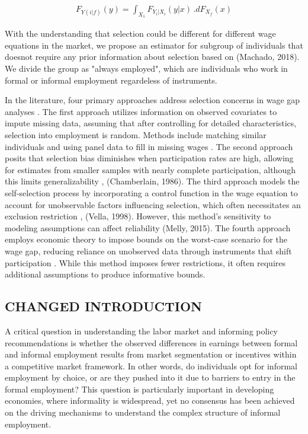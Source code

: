 \begin{linenomath*}
	\begin{align}
		F_{Y(i|f)} (y)= \int_{X_1} F_{Y_i|X_i}(y|x) \, . dF_{X_f}(x) 
	\end{align}
\end{linenomath*} 

With the understanding that selection could be different for different wage equations in the market, we propose an estimator for subgroup of individuals that doesnot require any prior information about selection based on (Machado, 2018). We divide the group as "always employed", which are individuals who work in formal or informal employment regardeless of instruments.

In the literature, four primary approaches address selection concerns in wage gap analyses \parencite{Machado2017}. The first approach utilizes information on observed covariates to impute missing data, assuming that after controlling for detailed characteristics, selection into employment is random. Methods include matching similar individuals and using panel data to fill in missing wages \parencite{Blau2006, Neal2004, Olivetti2016}. The second approach posits that selection bias diminishes when participation rates are high, allowing for estimates from smaller samples with nearly complete participation, although this limits generalizability \parencite{Mulligan2008} , (Chamberlain, 1986). The third approach models the self-selection process by incorporating a control function in the wage equation to account for unobservable factors influencing selection, which often necessitates an exclusion restriction \parencite{Heckman1974}, (Vella, 1998). However, this method's sensitivity to modeling assumptions can affect reliability \parencite{Bar2015} (Melly, 2015). The fourth approach employs economic theory to impose bounds on the worst-case scenario for the wage gap, reducing reliance on unobserved data through instruments that shift participation \parencite{Manski1990, Blundell2007}. While this method imposes fewer restrictions, it often requires additional assumptions to produce informative bounds.



\subsection{CHANGED INTRODUCTION}
A critical question in understanding the labor market and informing policy recommendations is whether the observed differences in earnings between formal and informal employment results from market segmentation or incentives within a competitive market framework. In other words, do individuals opt for informal employment by choice, or are they pushed into it due to barriers to entry in the formal employment? This question is particularly important in developing economies, where informality is widespread, yet no consensus has been achieved on the driving mechanisms to understand the complex structure of informal employment.

